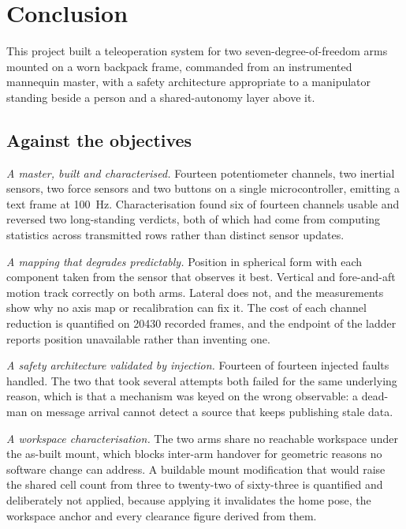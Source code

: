 \chapter{Conclusion}
\label{ch:conclusion}

This project built a teleoperation system for two seven-degree-of-freedom arms
mounted on a worn backpack frame, commanded from an instrumented mannequin
master, with a safety architecture appropriate to a manipulator standing
beside a person and a shared-autonomy layer above it.

\section{Against the objectives}

\emph{A master, built and characterised.} Fourteen potentiometer channels, two
inertial sensors, two force sensors and two buttons on a single
microcontroller, emitting a text frame at \SI{100}{\hertz}. Characterisation
found six of fourteen channels usable and reversed two long-standing verdicts,
both of which had come from computing statistics across transmitted rows
rather than distinct sensor updates.

\emph{A mapping that degrades predictably.} Position in spherical form with
each component taken from the sensor that observes it best. Vertical and
fore-and-aft motion track correctly on both arms. Lateral does not, and the
measurements show why no axis map or recalibration can fix it. The cost of
each channel reduction is quantified on \num{20430} recorded frames, and the
endpoint of the ladder reports position unavailable rather than inventing one.

\emph{A safety architecture validated by injection.} Fourteen of fourteen
injected faults handled. The two that took several attempts both failed for
the same underlying reason, which is that a mechanism was keyed on the wrong
observable: a dead-man on message arrival cannot detect a source that keeps
publishing stale data.

\emph{A workspace characterisation.} The two arms share no reachable
workspace under the as-built mount, which blocks inter-arm handover for
geometric reasons no software change can address. A buildable mount
modification that would raise the shared cell count from three to twenty-two
of sixty-three is quantified and deliberately not applied, because applying it
invalidates the home pose, the workspace anchor and every clearance figure
derived from them.

